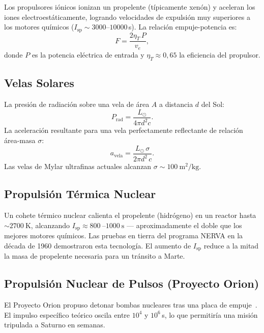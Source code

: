 \documentclass[12pt,a4paper]{article}
\begin{document}
Los propulsores iónicos ionizan un propelente (típicamente xenón) y aceleran
los iones electroestáticamente, logrando velocidades de expulsión muy
superiores a los motores químicos ($I_{\mathrm{sp}} \sim 3000$--$10000$\,s).
La relación empuje-potencia es:
\begin{equation}
  F = \frac{2\eta_T\,P}{v_e},
\end{equation}
donde $P$ es la potencia eléctrica de entrada y $\eta_T \approx 0{,}65$ la
eficiencia del propulsor.

\subsection{Velas Solares}

La presión de radiación sobre una vela de área $A$ a distancia $d$ del Sol:
\begin{equation}
  P_{\mathrm{rad}} = \frac{L_\odot}{4\pi d^2 c}.
\end{equation}
La aceleración resultante para una vela perfectamente reflectante de relación
área-masa $\sigma$:
\begin{equation}
  a_{\mathrm{vela}} = \frac{L_\odot\,\sigma}{2\pi d^2\,c}.
\end{equation}
Las velas de Mylar ultrafinas actuales alcanzan
$\sigma \sim \SI{100}{\meter\squared\per\kilo\gram}$.

\subsection{Propulsión Térmica Nuclear}

Un cohete térmico nuclear calienta el propelente (hidrógeno) en un reactor
hasta $\sim\SI{2700}{\kelvin}$, alcanzando
$I_{\mathrm{sp}} \approx \SI{800}{}$--$\SI{1000}{\second}$ --- aproximadamente
el doble que los mejores motores químicos. Las pruebas en tierra del programa
NERVA en la década de 1960 demostraron esta tecnología. El aumento de
$I_{\mathrm{sp}}$ reduce a la mitad la masa de propelente necesaria para un
tránsito a Marte.

\subsection{Propulsión Nuclear de Pulsos (Proyecto Orion)}

El Proyecto Orion propuso detonar bombas nucleares tras una placa de empuje~\citep{Dyson1968}.
El impulso específico teórico oscila entre $10^4$ y $10^6$\,s, lo que
permitiría una misión tripulada a Saturno en semanas.
\end{document}
